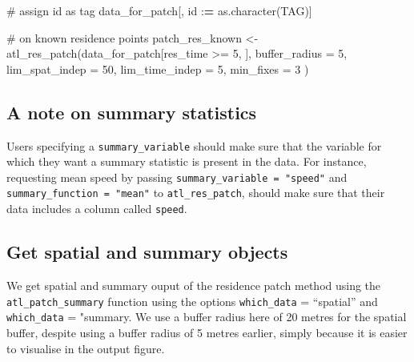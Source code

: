 \documentclass[]{scrreprt}
\newenvironment{Shaded}{}{}
\newcommand{\CommentTok}[1]{\textcolor[rgb]{0.00,0.50,0.00}{#1}}
\newcommand{\DataTypeTok}[1]{#1}
\newcommand{\DecValTok}[1]{#1}
\newcommand{\ErrorTok}[1]{\textcolor[rgb]{1.00,0.00,0.00}{\textbf{#1}}}
\newcommand{\KeywordTok}[1]{\textcolor[rgb]{0.00,0.00,1.00}{#1}}
\newcommand{\NormalTok}[1]{#1}
\newcommand{\OperatorTok}[1]{#1}
\newcommand{\StringTok}[1]{\textcolor[rgb]{0.00,0.50,0.50}{#1}}
\begin{document}
\begin{Shaded}
\begin{Highlighting}[]
\CommentTok{# assign id as tag}
\NormalTok{data_for_patch[, id }\OperatorTok{:}\ErrorTok{=}\StringTok{ }\KeywordTok{as.character}\NormalTok{(TAG)]}

\CommentTok{# on known residence points}
\NormalTok{patch_res_known <-}\StringTok{ }\KeywordTok{atl_res_patch}\NormalTok{(data_for_patch[res_time }\OperatorTok{>=}\StringTok{ }\DecValTok{5}\NormalTok{, ],}
  \DataTypeTok{buffer_radius =} \DecValTok{5}\NormalTok{,}
  \DataTypeTok{lim_spat_indep =} \DecValTok{50}\NormalTok{,}
  \DataTypeTok{lim_time_indep =} \DecValTok{5}\NormalTok{,}
  \DataTypeTok{min_fixes =} \DecValTok{3}
\NormalTok{)}
\end{Highlighting}
\end{Shaded}

\hypertarget{a-note-on-summary-statistics}{%
\subsection*{A note on summary statistics}\label{a-note-on-summary-statistics}}

Users specifying a \texttt{summary\_variable} should make sure that the variable for which they want a summary statistic is present in the data.
For instance, requesting mean speed by passing \texttt{summary\_variable\ =\ "speed"} and \texttt{summary\_function\ =\ "mean"} to \texttt{atl\_res\_patch}, should make sure that their data includes a column called \texttt{speed}.

\hypertarget{get-spatial-and-summary-objects}{%
\subsection{Get spatial and summary objects}\label{get-spatial-and-summary-objects}}

We get spatial and summary ouput of the residence patch method using the \texttt{atl\_patch\_summary} function using the options \texttt{which\_data} = ``spatial'' and \texttt{which\_data} = "summary.
We use a buffer radius here of 20 metres for the spatial buffer, despite using a buffer radius of 5 metres earlier, simply because it is easier to visualise in the output figure.
\end{document}
